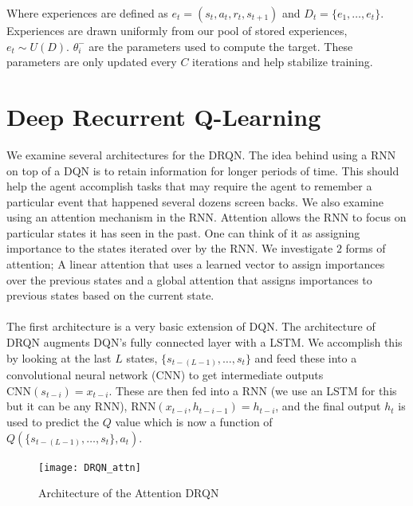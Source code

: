 \documentclass{article}
\begin{document}
Where experiences are defined as $e_t = (s_t, a_t, r_t, s_{t+1})$ and
$D_t = \{e_1, \dots, e_t\}$. Experiences are drawn uniformly from our pool of
stored experiences, $e_t \sim U(D)$. $\theta_i^-$ are the parameters used to compute
the target. These parameters are only updated every $C$ iterations and help
stabilize training.

\section{Deep Recurrent Q-Learning}

We examine several architectures for the DRQN. The idea behind using a RNN on top
of a DQN is to retain information for longer periods of time. This should help the
agent accomplish tasks that may require the agent to remember a particular event
that happened several dozens screen backs. We also examine using an attention
mechanism in the RNN. Attention allows the RNN to focus on particular states it
has seen in the past. One can think of it as assigning importance to the states
iterated over by the RNN. We investigate $2$ forms of attention; A linear attention
that uses a learned vector to assign importances over the previous states and a
global attention that assigns importances to previous states based on the current
state. \\
\\
The first architecture is a very basic extension of DQN. The architecture of DRQN
augments DQN's fully connected layer with a LSTM. We accomplish this by looking at
the last $L$ states, $\{s_{t-(L-1)}, \dots, s_{t}\}$ and feed these into a
convolutional neural network (CNN) to get intermediate outputs
$\text{CNN}(s_{t-i}) = x_{t-i}$. These are then fed into a RNN (we use an LSTM for
this but it can be any RNN), $\text{RNN}(x_{t-i}, h_{t-i-1}) = h_{t-i}$, and the
final output $h_t$ is used to predict the $Q$ value which is now a function of
$Q(\{s_{t-(L-1)}, \dots, s_t\}, a_t)$.

\begin{figure}[h]
    \centering
    \texttt{[image: DRQN\_attn]}
    \caption{Architecture of the Attention DRQN}
\end{figure}
\end{document}
